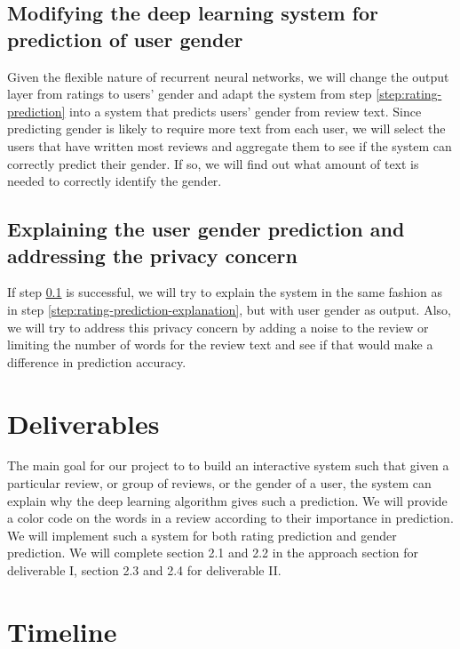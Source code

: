 \documentclass[11pt]{article}
\begin{document}
\subsection{Modifying the deep learning system for prediction of user gender}
\label{step:gender-prediction}

Given the flexible nature of recurrent neural networks, we will change the output layer from ratings to users' gender and adapt the system from step \ref{step:rating-prediction} into a system that predicts users' gender from review text. Since predicting gender is likely to require more text from each user, we will select the users that have written most reviews and aggregate them to see if the system can correctly predict their gender. If so, we will find out what amount of text is needed to correctly identify the gender.

\subsection{Explaining the user gender prediction and addressing the privacy concern}

If step \ref{step:gender-prediction} is successful, we will try to explain the system in the same fashion as in step \ref{step:rating-prediction-explanation}, but with user gender as output. Also, we will try to address this privacy concern by adding a noise to the review or limiting the number of words for the review text and see if that would make a difference in prediction accuracy. 

\section{Deliverables}

The main goal for our project to to build an interactive system such that given a particular review, or group of reviews, or the gender of a user, the system can explain why the deep learning algorithm gives such a prediction. We will provide a color code on the words in a review according to their importance in prediction. We will implement such a system for both rating prediction and gender prediction. We will complete section 2.1 and 2.2 in the approach section for deliverable I, section 2.3 and 2.4 for deliverable II. 

\section{Timeline}
\end{document}
